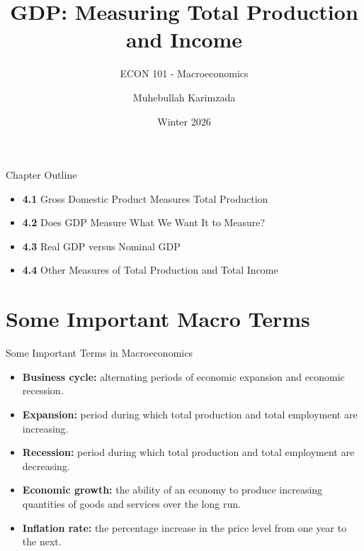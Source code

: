 \documentclass[aspectratio=169]{beamer}
\title{\textbf{GDP: Measuring Total Production and Income\vspace{.5cm}\\  }}
\subtitle{ {\large ECON 101 - Macroeconomics}}
\author{Muhebullah Karimzada}
\date{Winter 2026}
\begin{document}
\begin{frame}[plain]
  \titlepage
\end{frame}

\begin{frame}{Chapter Outline}
\transfade
\begin{itemize}[<+->]
  \item \textbf{4.1} Gross Domestic Product Measures Total Production
  \item \textbf{4.2} Does GDP Measure What We Want It to Measure?
  \item \textbf{4.3} Real GDP versus Nominal GDP
  \item \textbf{4.4} Other Measures of Total Production and Total Income
\end{itemize}
\end{frame}

\section*{Some Important Macro Terms}

\begin{frame}{Some Important Terms in Macroeconomics}
\transfade
\begin{itemize}[<+->]
  \item \textbf{Business cycle:} alternating periods of economic \alert{expansion} and economic \alert{recession}.
  \item \textbf{Expansion:} period during which total production and total employment are \alert{increasing}.
  \item \textbf{Recession:} period during which total production and total employment are \alert{decreasing}.
  \item \textbf{Economic growth:} the ability of an economy to produce \alert{increasing quantities} of goods and services over the long run.
  \item \textbf{Inflation rate:} the \alert{percentage increase} in the price level from one year to the next.
\end{itemize}
\end{frame}

\end{document}
